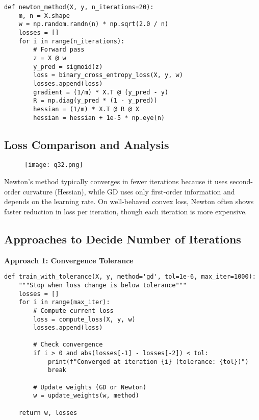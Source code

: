 \documentclass[12pt]{article}
\begin{document}
\begin{lstlisting}[caption={Newton's Method implementation}]
def newton_method(X, y, n_iterations=20):
    m, n = X.shape
    w = np.random.randn(n) * np.sqrt(2.0 / n)
    losses = []
    for i in range(n_iterations):
        # Forward pass
        z = X @ w
        y_pred = sigmoid(z)
        loss = binary_cross_entropy_loss(X, y, w)
        losses.append(loss)
        gradient = (1/m) * X.T @ (y_pred - y)
        R = np.diag(y_pred * (1 - y_pred))
        hessian = (1/m) * X.T @ R @ X
        hessian = hessian + 1e-5 * np.eye(n)

\end{lstlisting}
\subsection{Loss Comparison and Analysis}
\begin{figure}[h]
    \centering
    \texttt{[image: q32.png]}
\end{figure}

Newton's method typically converges in fewer iterations because it uses second-order curvature (Hessian),
while GD uses only first-order information and depends on the learning rate. On well-behaved convex loss,
Newton often shows faster reduction in loss per iteration, though each iteration is more expensive.

\subsection{Approaches to Decide Number of Iterations}

\textbf{Approach 1: Convergence Tolerance}

\begin{lstlisting}[caption={Convergence tolerance stopping criterion}]
def train_with_tolerance(X, y, method='gd', tol=1e-6, max_iter=1000):
    """Stop when loss change is below tolerance"""
    losses = []
    for i in range(max_iter):
        # Compute current loss
        loss = compute_loss(X, y, w)
        losses.append(loss)
        
        # Check convergence
        if i > 0 and abs(losses[-1] - losses[-2]) < tol:
            print(f"Converged at iteration {i} (tolerance: {tol})")
            break
        
        # Update weights (GD or Newton)
        w = update_weights(w, method)
    
    return w, losses
\end{lstlisting}
\end{document}

